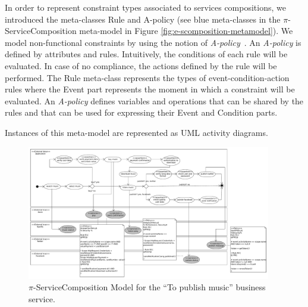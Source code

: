 \begin{itemizedTrivlist}
\item In order to represent constraint types associated to services compositions, we introduced the meta-classes {\sc Rule} and {\sc A-policy} (see blue meta-classes in the $\pi$-Serv\-ice\-Com\-po\-si\-tion meta-model in Figure \ref{fig:e-scomposition-metamodel}).
We model non-functional constraints by using the notion of {\em A-policy}~\cite{Espinosa-Oviedo2011a,CIC:eovszmc09c}.
An {\em A-policy} is defined by attributes and rules. 
Intuitively, the conditions of each rule will be evaluated.
In case of no compliance, the actions defined by the rule will be performed.
The {\sc Rule} meta-class represents the types of event-condition-action rules where the {\sc Event} part represents the moment in which a constraint  will be evaluated.
An {\em A-policy} defines variables and operations that can be shared by the rules and that can be used for expressing their Event and Condition parts. 
\end{itemizedTrivlist}
Instances of this meta-model are represented as UML activity diagrams. 
\begin{figure}[t]%
\centering
\includegraphics[width=0.95\textwidth]{figs/piServiceComposition-toPublishMusic}
\caption{$\pi$-ServiceComposition Model for the ``To publish
music'' business service.}
\label{fig:servicecompositionmodel}
\end{figure}

